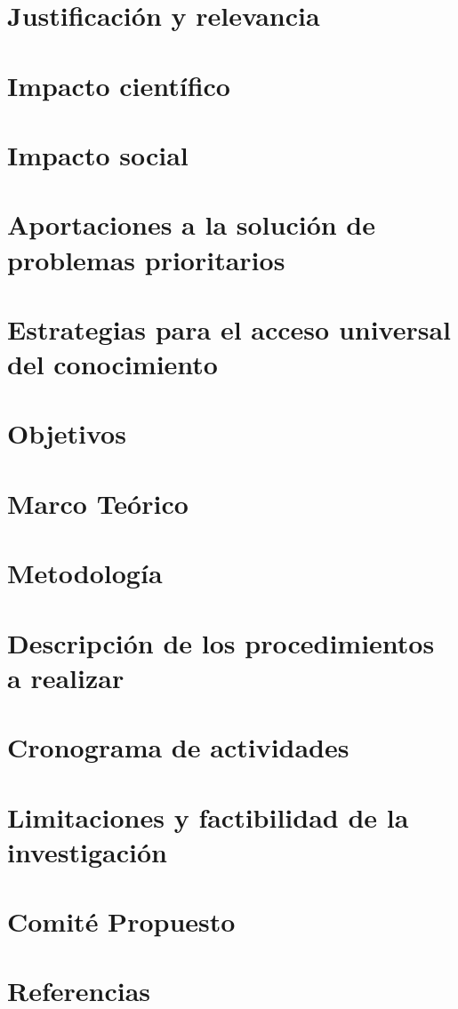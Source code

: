 \documentclass[10pt,letterpaper]{report}
\begin{document}
\chapter{Justificación y relevancia}

\chapter{Impacto científico}

\chapter{Impacto social}

\chapter{Aportaciones a la solución de problemas prioritarios}

\chapter{Estrategias para el acceso universal del conocimiento}

\chapter{Objetivos}

\chapter{Marco Teórico}

\chapter{Metodología}

\chapter{Descripción de los procedimientos a realizar}

\chapter{Cronograma de actividades}

\chapter{Limitaciones y factibilidad de la investigación}

\chapter{Comité Propuesto}

\chapter*{Referencias}
\printbibliography[title={Referencias}]
\end{document}
